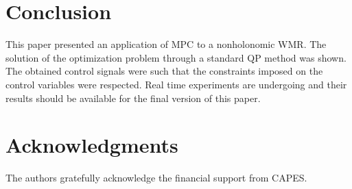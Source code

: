 \documentclass[conference]{IEEEtran} %
\begin{document}
\section{Conclusion}
\label{sec:conclusions}

This paper presented an application of MPC to a nonholonomic WMR. The solution of the optimization problem through a standard QP method was shown. The obtained control signals were such that the constraints imposed on the control variables were respected. Real time experiments are undergoing and their results should be available for the final version of this paper.

\section{Acknowledgments}

The authors gratefully acknowledge the financial support from CAPES.



\end{document}
